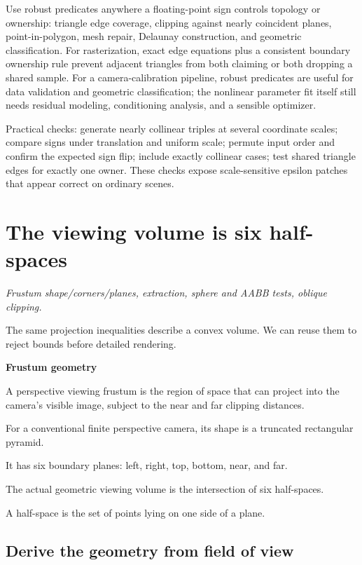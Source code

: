 Use robust predicates anywhere a floating-point sign controls topology or ownership: triangle edge coverage, clipping against nearly coincident planes, point-in-polygon, mesh repair, Delaunay construction, and geometric classification. For rasterization, exact edge equations plus a consistent boundary ownership rule prevent adjacent triangles from both claiming or both dropping a shared sample. For a camera-calibration pipeline, robust predicates are useful for data validation and geometric classification; the nonlinear parameter fit itself still needs residual modeling, conditioning analysis, and a sensible optimizer.

Practical checks: generate nearly collinear triples at several coordinate scales; compare signs under translation and uniform scale; permute input order and confirm the expected sign flip; include exactly collinear cases; test shared triangle edges for exactly one owner. These checks expose scale-sensitive epsilon patches that appear correct on ordinary scenes.

\section{The viewing volume is six half-spaces}\label{02-foundations-ii-ch034-the-viewing-volume-is-six-half-spaces}

\emph{Frustum shape/corners/planes, extraction, sphere and AABB tests, oblique clipping.}

The same projection inequalities describe a convex volume. We can reuse them to reject bounds before detailed rendering.

\textbf{Frustum geometry}

A perspective viewing frustum is the region of space that can project into the camera's visible image, subject to the near and far clipping distances.

For a conventional finite perspective camera, its shape is a truncated rectangular pyramid.

It has six boundary planes: left, right, top, bottom, near, and far.

The actual geometric viewing volume is the intersection of six half-spaces.

A half-space is the set of points lying on one side of a plane.

\subsection{Derive the geometry from field of view}\label{02-foundations-ii-ch034-derive-the-geometry-from-field-of-view}

